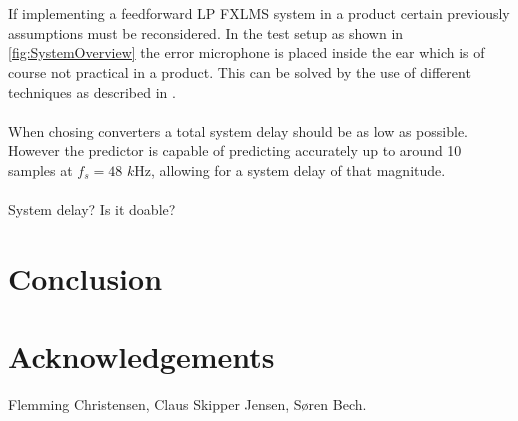 \\\\
If implementing a feedforward LP FXLMS system in a product certain previously assumptions must be reconsidered. In the test setup as shown in \autoref{fig:SystemOverview} the error microphone is placed inside the ear which is of course not practical in a product. This can be solved by the use of different techniques as described in \cite{Hansen}.  
\\\\
When chosing converters a total system delay should be as low as possible. However the predictor is capable of predicting accurately up to around 10 samples at $f_s=48$ $k$Hz, allowing for a system delay of that magnitude.
\\\\



System delay?
Is it doable?










\section{Conclusion}

\section*{Acknowledgements}
Flemming Christensen, Claus Skipper Jensen, Søren Bech. 
